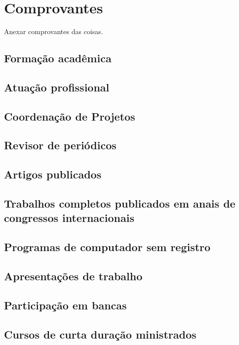 \section{Comprovantes}


Anexar comprovantes das coisas.

\citet{uieda2016a}


\subsection{Formação acadêmica}


\subsection{Atuação profissional}


\subsection{Coordenação de Projetos}


\subsection{Revisor de periódicos}


\subsection{Artigos publicados}


\subsection{Trabalhos completos publicados em anais de congressos internacionais}


\subsection{Programas de computador sem registro}


\subsection{Apresentações de trabalho}


\subsection{Participação em bancas}


\subsection{Cursos de curta duração ministrados}
